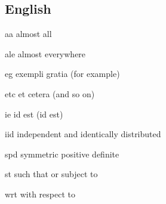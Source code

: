 \documentclass[english,a4paper,DIV=12,parskip=full,oneside]{scrartcl}
\begin{document}
        \subsection{English}
        \begin{commandlist}
            \item[aa] almost all \codeExample{\aa}
            \item[ale] almost everywhere \codeExample{\ale}
            \item[eg] exempli gratia (for example) \codeExample{\eg}
            \item[etc] et cetera (and so on) \codeExample{\etc}
            \item[ie] id est (id est) \codeExample{\ie}
            \item[iid] independent and identically distributed \codeExample{\iid}
            \item[spd] symmetric positive definite \codeExample{\spd}
            \item[st] such that or subject to \codeExample{\st}
            \item[wrt] with respect to \codeExample{\wrt}
        \end{commandlist}
\end{document}
